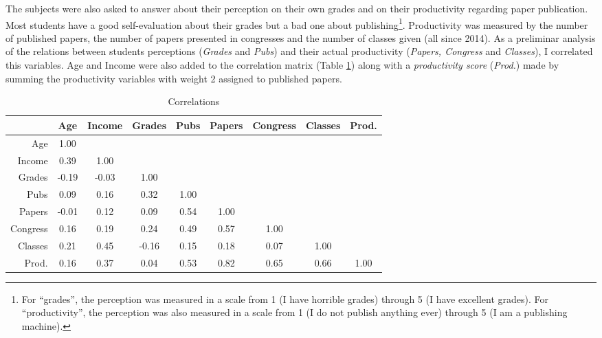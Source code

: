 \documentclass[12pt, english]{article}
\begin{document}
The subjects were also asked to answer about their perception on their own grades and on their productivity regarding paper publication. Most students have a good self-evaluation about their grades but a bad one about publishing\footnote{For ``grades'', the perception was measured in a scale from 1 (I have horrible grades) through 5 (I have excellent grades). For ``productivity'', the perception was also measured in a scale from 1 (I do not publish anything ever) through 5 (I am a publishing machine).}. Productivity was measured by the number of published papers, the number of papers presented in congresses and the number of classes given (all since 2014). As a preliminar analysis of the relations between students perceptions (\textit{Grades} and \textit{Pubs}) and their actual productivity (\textit{Papers, Congress} and \textit{Classes}), I correlated this variables. Age and Income were also added to the correlation matrix (Table \ref{correlations}) along with a \textit{productivity score} (\textit{Prod.}) made by summing the productivity variables with weight 2 assigned to published papers.




	

\begin{table}[ht]

		\centering
		\caption{Correlations}
		\label{correlations}
	
	\begin{tabular}{r|cccccccc}
			\hline
			& Age & Income & Grades & Pubs & Papers & Congress & Classes & Prod. \\ 
			\hline
			Age & 1.00 &  &  &  &  &  &  &  \\ 
			Income & 0.39 & 1.00 &  &  &  &  &  &  \\ 
			Grades & -0.19 & -0.03 & 1.00 &  &  &  &  &  \\ 
			Pubs & 0.09 & 0.16 & 0.32 & 1.00 &  &  &  &  \\ 
			Papers & -0.01 & 0.12 & 0.09 & 0.54 & 1.00 &  &  &  \\ 
			Congress & 0.16 & 0.19 & 0.24 & 0.49 & 0.57 & 1.00 &  &  \\ 
			Classes & 0.21 & 0.45 & -0.16 & 0.15 & 0.18 & 0.07 & 1.00 &  \\ 
			Prod. & 0.16 & 0.37 & 0.04 & 0.53 & 0.82 & 0.65 & 0.66 & 1.00 \\ 
			\hline
		\end{tabular}
	
	
\end{table}
\end{document}
